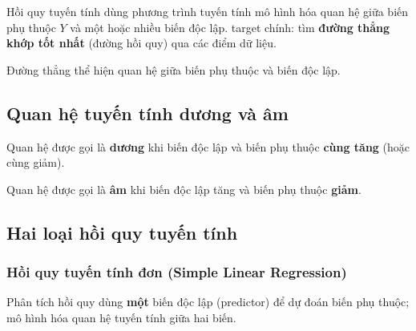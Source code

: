 \begin{dinhnghia}[title={Định nghĩa trong học máy}]
Hồi quy tuyến tính dùng phương trình tuyến tính mô hình hóa quan hệ giữa biến phụ thuộc $Y$ và một hoặc nhiều biến độc lập.
target chính: tìm \textbf{đường thẳng khớp tốt nhất} (đường hồi quy) qua các điểm dữ liệu.
\end{dinhnghia}

\begin{dinhnghia}[title={Đường hồi quy (Line of Regression)}]
Đường thẳng thể hiện quan hệ giữa biến phụ thuộc và biến độc lập.
\end{dinhnghia}


\subsection{Quan hệ tuyến tính dương và âm}

\begin{ynghia}[title={Quan hệ tuyến tính dương (Positive Linear Relationship)}]
Quan hệ được gọi là \textbf{dương} khi biến độc lập và biến phụ thuộc \textbf{cùng tăng} (hoặc cùng giảm).
\end{ynghia}


\begin{ynghia}[title={Quan hệ tuyến tính âm (Negative Linear Relationship)}]
Quan hệ được gọi là \textbf{âm} khi biến độc lập tăng và biến phụ thuộc \textbf{giảm}.
\end{ynghia}


\subsection{Hai loại hồi quy tuyến tính}

\subsubsection{Hồi quy tuyến tính đơn (Simple Linear Regression)}

\begin{dinhnghia}[title={Hồi quy tuyến tính đơn}]
Phân tích hồi quy dùng \textbf{một} biến độc lập (predictor) để dự đoán biến phụ thuộc; mô hình hóa quan hệ tuyến tính giữa hai biến.
\end{dinhnghia}

